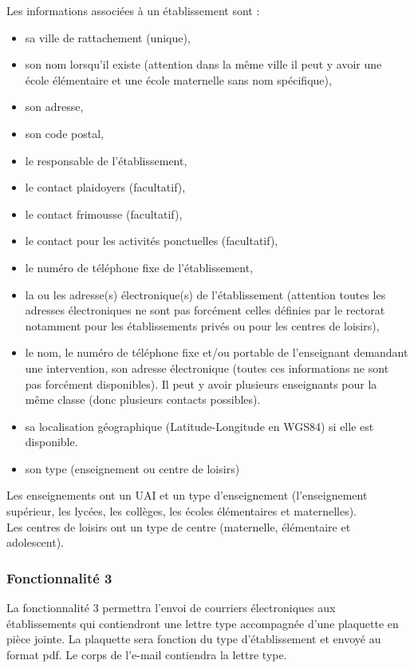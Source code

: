 Les informations associées à un établissement sont :
\begin{itemize}
\item sa ville de rattachement (unique), 
\item son nom lorsqu'il existe (attention dans la même ville il peut y avoir une école élémentaire et une école maternelle sans nom spécifique), 
\item son adresse,
\item son code postal,
\item le responsable de l'établissement, 
\item le contact plaidoyers (facultatif),
\item le contact frimousse (facultatif),
\item le contact pour les activités ponctuelles (facultatif),
\item le numéro de téléphone fixe de l'établissement, 
\item la ou les adresse(s) électronique(s) de l'établissement (attention toutes les adresses électroniques ne sont pas forcément celles définies par le rectorat notamment pour les établissements privés ou pour les centres de loisirs), 
\item le nom, le numéro de téléphone fixe et/ou portable de l'enseignant demandant une intervention, son adresse électronique (toutes ces informations ne sont pas forcément disponibles). Il peut y avoir plusieurs enseignants pour la même classe (donc plusieurs contacts possibles).
\item sa localisation géographique (Latitude-Longitude en WGS84) si elle est disponible.
\item son type (enseignement ou centre de loisirs)
\\
\end{itemize}
Les enseignements ont un UAI et un type d'enseignement (l'enseignement supérieur, les lycées, les collèges, les écoles élémentaires et maternelles). \\
Les centres de loisirs ont un type de centre (maternelle, élémentaire et adolescent). 
\\

\subsubsection{Fonctionnalité 3}
La fonctionnalité 3 permettra l'envoi de courriers électroniques aux établissements qui contiendront une lettre type accompagnée d'une plaquette en pièce jointe. La plaquette sera fonction du type d'établissement et envoyé au format pdf. Le corps de l'e-mail contiendra la lettre type. 

